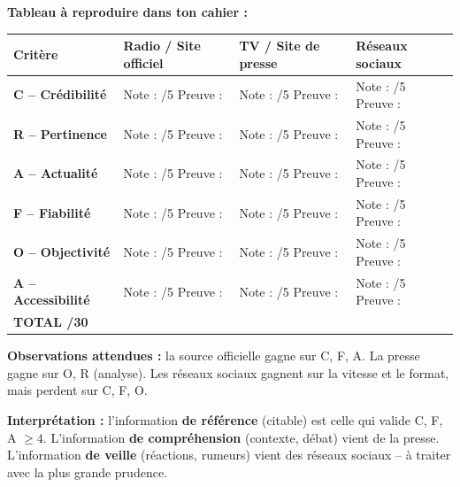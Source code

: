 \documentclass[11pt]{article}
\begin{document}
\begin{experience}
\textbf{Tableau à reproduire dans ton cahier :}
\begin{center}
\begin{tabularx}{\linewidth}{|l|X|X|X|}
\hline
\rowcolor{popblueL}
\textbf{Critère} & \textbf{Radio / Site officiel} & \textbf{TV / Site de presse} & \textbf{Réseaux sociaux} \\
\hline
\textbf{C -- Crédibilité} & Note : /5 \newline Preuve : & Note : /5 \newline Preuve : & Note : /5 \newline Preuve : \\
\hline
\textbf{R -- Pertinence} & Note : /5 \newline Preuve : & Note : /5 \newline Preuve : & Note : /5 \newline Preuve : \\
\hline
\textbf{A -- Actualité} & Note : /5 \newline Preuve : & Note : /5 \newline Preuve : & Note : /5 \newline Preuve : \\
\hline
\textbf{F -- Fiabilité} & Note : /5 \newline Preuve : & Note : /5 \newline Preuve : & Note : /5 \newline Preuve : \\
\hline
\textbf{O -- Objectivité} & Note : /5 \newline Preuve : & Note : /5 \newline Preuve : & Note : /5 \newline Preuve : \\
\hline
\textbf{A -- Accessibilité} & Note : /5 \newline Preuve : & Note : /5 \newline Preuve : & Note : /5 \newline Preuve : \\
\hline
\textbf{TOTAL /30} & \textbf{ } & \textbf{ } & \textbf{ } \\
\hline
\end{tabularx}
\end{center}

\textbf{Observations attendues :} la source officielle gagne sur C, F, A. La presse gagne sur O, R (analyse). Les réseaux sociaux gagnent sur la vitesse et le format, mais perdent sur C, F, O.

\textbf{Interprétation :} l'information \textbf{de référence} (citable) est celle qui valide C, F, A $\ge 4$. L'information \textbf{de compréhension} (contexte, débat) vient de la presse. L'information \textbf{de veille} (réactions, rumeurs) vient des réseaux sociaux -- à traiter avec la plus grande prudence.
\end{experience}
\end{document}
